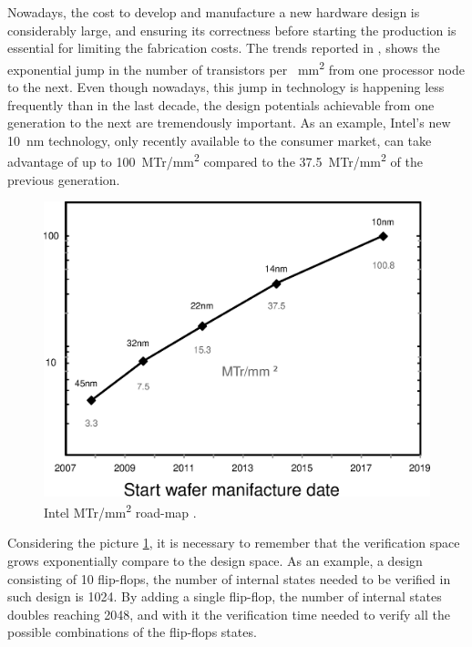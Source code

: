 \par Nowadays, the cost to develop and manufacture a new hardware design is
considerably large, and ensuring its correctness before starting the production
is essential for limiting the fabrication costs. The trends reported in
\cite{mistry10nm}, shows the exponential jump in the number of transistors per
\SI{}{\milli\meter\squared} from one processor node to the next. Even though
nowadays, this jump in technology is happening less frequently than in the last
decade, the design potentials achievable from one generation to the next are
tremendously important. As an example, Intel's new \SI{10}{\nano\meter}
technology, only recently available to the consumer market, can take advantage
of up to \SI{100}{MTr/\milli\meter\squared} compared to the
\SI{37.5}{MTr/\milli\meter\squared} of the previous generation.

\begin{figure}[htb]
\centering
\includegraphics[width=0.7\linewidth]{pictures/Intel_scaling.eps}
\caption{Intel \si{MTr/mm^2} road-map \cite{mistry10nm}.}
\label{fig:ITMroadmap}
\end{figure}

\par Considering the picture \ref{fig:ITMroadmap}, it is necessary to remember
that the verification space grows exponentially compare to the design space. As
an example, a design consisting of 10 flip-flops, the number of internal states
needed to be verified in such design is 1024. By adding a single flip-flop, the
number of internal states doubles reaching 2048, and with it the verification
time needed to verify all the possible combinations of the flip-flops states.

